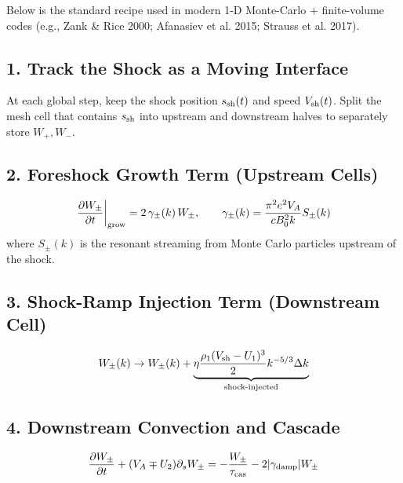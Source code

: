 Below is the standard recipe used in modern 1-D Monte-Carlo + finite-volume codes (e.g., Zank \& Rice 2000; Afanasiev et al. 2015; Strauss et al. 2017).

\subsection*{1. Track the Shock as a Moving Interface}
At each global step, keep the shock position $s_{\rm sh}(t)$ and speed $V_{\rm sh}(t)$. Split the mesh cell that contains $s_{\rm sh}$ into upstream and downstream halves to separately store $W_+, W_-$.

\subsection*{2. Foreshock Growth Term (Upstream Cells)}
\[
\frac{\partial W_\pm}{\partial t}\bigg|_{\rm grow} = 2\,\gamma_\pm(k)\,W_\pm, \qquad \gamma_\pm(k) = \frac{\pi^2 e^2 V_A}{c B_0^2 k} S_\pm(k)
\]
where $S_\pm(k)$ is the resonant streaming from Monte Carlo particles upstream of the shock.

\subsection*{3. Shock-Ramp Injection Term (Downstream Cell)}
\[
W_\pm(k) \rightarrow W_\pm(k) + 
\underbrace{
\eta \frac{\rho_1 (V_{\rm sh} - U_1)^3}{2} k^{-5/3} \Delta k
}_{\text{shock-injected}}
\]

\subsection*{4. Downstream Convection and Cascade}
\[
\frac{\partial W_\pm}{\partial t} + (V_A \mp U_2) \partial_s W_\pm = -\frac{W_\pm}{\tau_{\rm cas}} - 2|\gamma_{\rm damp}| W_\pm
\]

